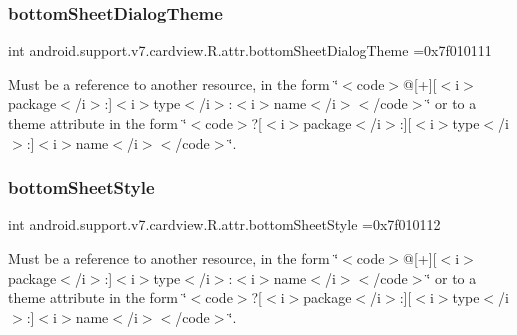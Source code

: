 \subsubsection{\texorpdfstring{bottom\+Sheet\+Dialog\+Theme}{bottomSheetDialogTheme}}
{\footnotesize\ttfamily int android.\+support.\+v7.\+cardview.\+R.\+attr.\+bottom\+Sheet\+Dialog\+Theme =0x7f010111\hspace{0.3cm}{\ttfamily [static]}}

Must be a reference to another resource, in the form \char`\"{}$<$code$>$@\mbox{[}+\mbox{]}\mbox{[}$<$i$>$package$<$/i$>$\+:\mbox{]}$<$i$>$type$<$/i$>$\+:$<$i$>$name$<$/i$>$$<$/code$>$\char`\"{} or to a theme attribute in the form \char`\"{}$<$code$>$?\mbox{[}$<$i$>$package$<$/i$>$\+:\mbox{]}\mbox{[}$<$i$>$type$<$/i$>$\+:\mbox{]}$<$i$>$name$<$/i$>$$<$/code$>$\char`\"{}. \mbox{\label{classandroid_1_1support_1_1v7_1_1cardview_1_1R_1_1attr_a67ed112d398d6e373347557827c40fdd}} 
\subsubsection{\texorpdfstring{bottom\+Sheet\+Style}{bottomSheetStyle}}
{\footnotesize\ttfamily int android.\+support.\+v7.\+cardview.\+R.\+attr.\+bottom\+Sheet\+Style =0x7f010112\hspace{0.3cm}{\ttfamily [static]}}

Must be a reference to another resource, in the form \char`\"{}$<$code$>$@\mbox{[}+\mbox{]}\mbox{[}$<$i$>$package$<$/i$>$\+:\mbox{]}$<$i$>$type$<$/i$>$\+:$<$i$>$name$<$/i$>$$<$/code$>$\char`\"{} or to a theme attribute in the form \char`\"{}$<$code$>$?\mbox{[}$<$i$>$package$<$/i$>$\+:\mbox{]}\mbox{[}$<$i$>$type$<$/i$>$\+:\mbox{]}$<$i$>$name$<$/i$>$$<$/code$>$\char`\"{}. \mbox{\label{classandroid_1_1support_1_1v7_1_1cardview_1_1R_1_1attr_ad41eb3028d5151ba75e3688b33611e57}} 
